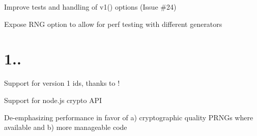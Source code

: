 \begin{DoxyItemize}
\item Improve tests and handling of v1() options (Issue \#24)
\item Expose R\+NG option to allow for perf testing with different generators
\end{DoxyItemize}

\section*{1..}


\begin{DoxyItemize}
\item Support for version 1 ids, thanks to \href{https://github.com/ctavan}{\tt }!
\item Support for node.\+js crypto A\+PI
\item De-\/emphasizing performance in favor of a) cryptographic quality P\+R\+N\+Gs where available and b) more manageable code 
\end{DoxyItemize}